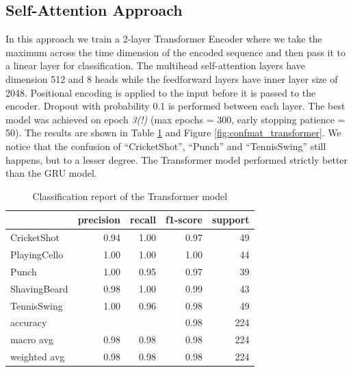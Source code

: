 \documentclass{article}
\begin{document}
\subsection{Self-Attention Approach}
In this approach we train a 2-layer Transformer Encoder where we take the maximum across the time dimension of the encoded sequence and then pass it to a linear layer for classification. The multihead self-attention layers have dimension 512 and 8 heads while the feedforward layers have inner layer size of 2048. Positional encoding is applied to the input before it is passed to the encoder. Dropout with probability 0.1 is performed between each layer. The best model was achieved on epoch \emph{3(!)} (max epochs = 300, early stopping patience = 50). The results are shown in Table \ref{clfrep:transformer} and Figure \ref{fig:confmat_transformer}. We notice that the confusion of “CricketShot”, “Punch” and “TennisSwing” still happens, but to a lesser degree. The Transformer model performed strictly better than the GRU model.

\begin{table}[h]
    \label{clfrep:transformer}
    \centering
    \begin{tabular}{lrrrr}
        \toprule
        & precision & recall & f1-score & support \\
        \midrule
        CricketShot & 0.94 & 1.00 & 0.97 & 49 \\
        PlayingCello & 1.00 & 1.00 & 1.00 & 44 \\
        Punch & 1.00 & 0.95 & 0.97 & 39 \\
        ShavingBeard & 0.98 & 1.00 & 0.99 & 43 \\
        TennisSwing & 1.00 & 0.96 & 0.98 & 49 \\
        \midrule
        accuracy &  &  & 0.98 & 224 \\
        macro avg & 0.98 & 0.98 & 0.98 & 224 \\
        weighted avg & 0.98 & 0.98 & 0.98 & 224 \\
        \bottomrule
    \end{tabular}
    \caption{Classification report of the Transformer model}
\end{table}
\end{document}

